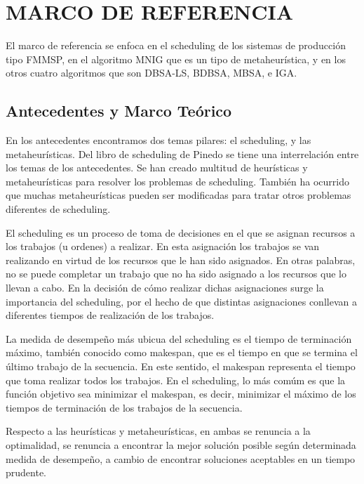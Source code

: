 \documentclass{article}
\begin{document}
\section{MARCO DE REFERENCIA}

El marco de referencia se enfoca en el scheduling de los sistemas de producción tipo FMMSP, en el algoritmo MNIG que es un tipo de metaheurística, y en los otros cuatro algoritmos que son DBSA-LS, BDBSA, MBSA, e IGA.

\subsection{Antecedentes y Marco Teórico}

En los antecedentes encontramos dos temas pilares: el scheduling, y las metaheurísticas. Del libro de scheduling de Pinedo \autocite{schedPinedo} se tiene una interrelación entre los temas de los antecedentes. Se han creado multitud de heurísticas y metaheurísticas para resolver los problemas de scheduling. También ha ocurrido que muchas metaheurísticas pueden ser modificadas para tratar otros problemas diferentes de scheduling.

\vspace{\baselineskip}
El scheduling es un proceso de toma de decisiones en el que se asignan recursos a los trabajos (u ordenes) a realizar. En esta asignación los trabajos se van realizando en virtud de los recursos que le han sido asignados. En otras palabras, no se puede completar un trabajo que no ha sido asignado a los recursos que lo llevan a cabo. En la decisión de cómo realizar dichas asignaciones surge la importancia del scheduling, por el hecho de que distintas asignaciones conllevan a diferentes tiempos de realización de los trabajos. \autocite{schedPinedo}

\vspace{\baselineskip}
La medida de desempeño más ubicua del scheduling es el tiempo de terminación máximo, también conocido como makespan, que es el tiempo en que se termina el último trabajo de la secuencia. En este sentido, el makespan representa el tiempo que toma realizar todos los trabajos. En el scheduling, lo más comúm es que la función objetivo sea minimizar el makespan, es decir, minimizar el máximo de los tiempos de terminación de los trabajos de la secuencia. \autocite{schedPinedo}

\vspace{\baselineskip}
Respecto a las heurísticas y metaheurísticas, en ambas se renuncia a la optimalidad, se renuncia a encontrar la mejor solución posible según determinada medida de desempeño, a cambio de encontrar soluciones aceptables en un tiempo prudente. \autocite{metaTalbi}
\end{document}
